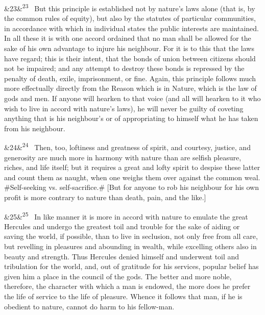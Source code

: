 \documentclass[12pt]{article}
\newcommand{\para}[1][]{\par\noindent\ifx&#1&\else\textsuperscript{\footnotesize #1}~\fi}
\begin{document}
\para[23] But this principle is established not by nature's laws alone (that is, by the common rules of equity), but also by the statutes of particular communities, in accordance with which in individual states the public interests are maintained. In all these it is with one accord ordained that no man shall be allowed for the sake of his own advantage to injure his neighbour. For it is to this that the laws have regard; this is their intent, that the bonds of union between citizens should not be impaired; and any attempt to destroy these bonds is repressed by the penalty of death, exile, imprisonment, or fine. Again, this principle follows much more effectually directly from the Reason which is in Nature, which is the law of gods and men. If anyone will hearken to that voice (and all will hearken to it who wish to live in accord with nature's laws), he will never be guilty of coveting anything that is his neighbour's or of appropriating to himself what he has taken from his neighbour.

\para[24] Then, too, loftiness and greatness of spirit, and courtesy, justice, and generosity are much more in harmony with nature than are selfish pleasure, riches, and life itself; but it requires a great and lofty spirit to despise these latter and count them as naught, when one weighs them over against the common weal. \#Self-seeking vs. self-sacrifice.\# [But for anyone to rob his neighbour for his own profit is more contrary to nature than death, pain, and the like.]

\para[25] In like manner it is more in accord with nature to emulate the great Hercules and undergo the greatest toil and trouble for the sake of aiding or saving the world, if possible, than to live in seclusion, not only free from all care, but revelling in pleasures and abounding in wealth, while excelling others also in beauty and strength. Thus Hercules denied himself and underwent toil and tribulation for the world, and, out of gratitude for his services, popular belief has given him a place in the council of the gods. The better and more noble, therefore, the character with which a man is endowed, the more does he prefer the life of service to the life of pleasure. Whence it follows that man, if he is obedient to nature, cannot do harm to his fellow-man.
\end{document}
